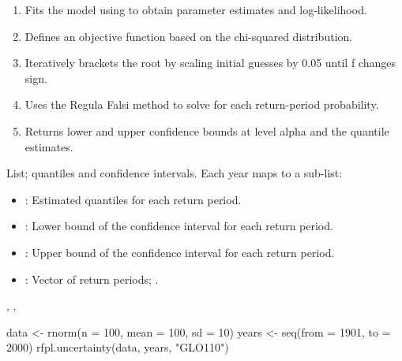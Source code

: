\documentclass[a4paper]{book}
\begin{document}
%
\begin{Details}
\begin{enumerate}

\item{} Fits the model using  to obtain parameter estimates and log‐likelihood.
\item{} Defines an objective function  based on the chi-squared distribution.
\item{} Iteratively brackets the root by scaling initial guesses by 0.05 until f changes sign.
\item{} Uses the Regula Falsi method to solve  for each return-period probability.
\item{} Returns lower and upper confidence bounds at level alpha and the quantile estimates.

\end{enumerate}

\end{Details}
%
\begin{Value}
List; quantiles and confidence intervals. Each year maps to a sub-list:
\begin{itemize}

\item{} : Estimated quantiles for each return period.
\item{} : Lower bound of the confidence interval for each return period.
\item{} : Upper bound of the confidence interval for each return period.
\item{} : Vector of return periods; .

\end{itemize}

\end{Value}
%
\begin{SeeAlso}
, , 
\end{SeeAlso}
%
\begin{Examples}
\begin{ExampleCode}
data <- rnorm(n = 100, mean = 100, sd = 10)
years <- seq(from = 1901, to = 2000)
rfpl.uncertainty(data, years, "GLO110")

\end{ExampleCode}
\end{Examples}
\end{document}
